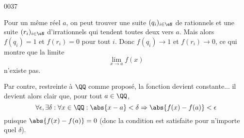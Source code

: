 
\begin{corrige}{0037}

Pour un même réel $a$, on peut trouver une suite $(q_i)_{i\in\eN}$ de rationnels et une suite $(r_i)_{i\in\eN}$ d'irrationnels qui tendent toutes deux vers $a$. Mais alors $f(q_i) = 1$ et $f(r_i) = 0$ pour tout $i$. Donc $f(q_i) \to 1$ et $f(r_i) \to 0$, ce qui montre que la limite
\begin{equation*}
	\lim_{x\to a} f(x)
\end{equation*}
n'existe pas.

Par contre, restreinte à $\QQ$ comme proposé, la fonction devient
constante... il devient alors clair que, pour tout $a \in \QQ$,
\begin{equation*}
  \forall \epsilon, \exists \delta : \forall x \in \QQ : \abs{x-a} <
  \delta \Rightarrow \abs{f(x) - f(a)} < \epsilon
\end{equation*}
puisque $\abs{f(x) - f(a)} = 0$ (donc la condition est satisfaite pour
n'importe quel $\delta$).


\end{corrige}
